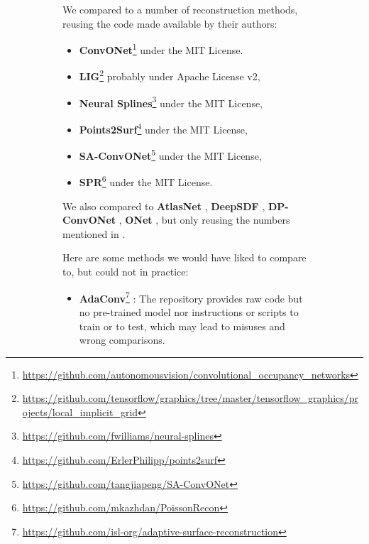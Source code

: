 \documentclass[10pt,twocolumn,letterpaper]{article}
\begin{document}
\begin{figure}[t]
\begin{figure}[t]
We compared to a number of reconstruction methods, reusing the code made available by their authors:
\begin{itemize}[itemsep=4pt,topsep=4pt, parsep=0pt]

\item \textbf{ConvONet}\footnote{\label{foot:convonet}\url{https://github.com/autonomousvision/convolutional_occupancy_networks}} \cite{Peng2020ECCV} under the MIT License.

\item \textbf{LIG}\footnote{\label{foot:lig}\url{https://github.com/tensorflow/graphics/tree/master/tensorflow_graphics/projects/local_implicit_grid}} \cite{Jiang2020CVPR} probably under Apache License v2,

\item \textbf{Neural Splines}\footnote{\label{foot:neuralsplines}\url{https://github.com/fwilliams/neural-splines}} \cite{Williams2021NeuralSplines}  under the
MIT License,

\item \textbf{Points2Surf}\footnote{\label{foot:points2surf}\url{https://github.com/ErlerPhilipp/points2surf}} \cite{Erler2020Points2Surf} under the MIT License,

\item \textbf{SA-ConvONet}\footnote{\label{foot:saconvonet}\url{https://github.com/tangjiapeng/SA-ConvONet}} \cite{tang2021sign} under the MIT License,

\item \textbf{SPR}\footnote{\label{foot:spr}\url{https://github.com/mkazhdan/PoissonRecon}} \cite{Kazhdan2013SIGGRAPH} under the MIT License.

\end{itemize}
We also compared to \textbf{AtlasNet} \cite{Groueix2018CVPR}, \textbf{DeepSDF} \cite{Park2019CVPR}, \textbf{DP-ConvONet} \cite{Lionar_2021_WACV}, \textbf{ONet} \cite{Mescheder2019CVPR}, but only reusing the numbers mentioned in \cite{Peng2020ECCV, Lionar_2021_WACV}.

\medskip

Here are some methods we would have liked to compare to, but could not in practice:
\begin{itemize}[itemsep=-2pt,topsep=1pt]

\item \textbf{AdaConv}\footnote{\label{foot:adaconv}\url{https://github.com/isl-org/adaptive-surface-reconstruction}} \cite{Ummenhofer2021Adaptive}: The repository provides raw code but no pre-trained model nor instructions or scripts to train or to test, which may lead to misuses and wrong comparisons. 


\end{itemize}
\end{figure}
\end{figure}
\end{document}

